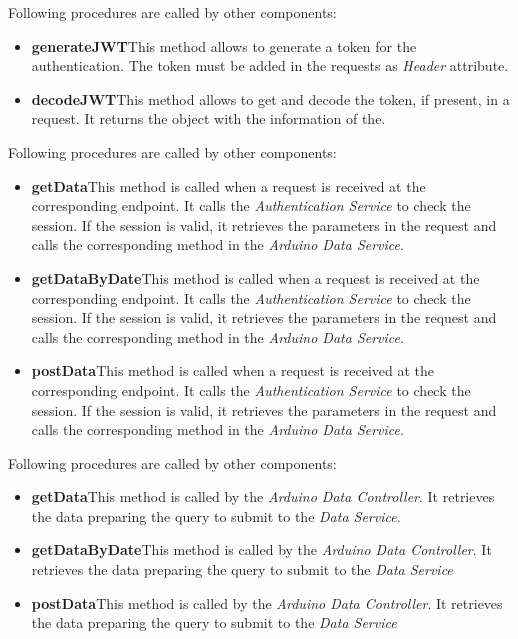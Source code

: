 Following procedures are called by other components:
\begin{itemize}
    \item \textbf{generateJWT}\quad This method allows to generate a token for the authentication. The token must be added in the requests as \textit{Header} attribute.
    \item \textbf{decodeJWT}\quad This method allows to get and decode the token, if present, in a request. It returns the object with the information of the.
\end{itemize}

Following procedures are called by other components:
\begin{itemize}
    \item \textbf{getData}\quad This method is called when a request is received at the corresponding endpoint. It calls the \textit{Authentication Service} to check the session. If the session is valid, it retrieves the parameters in the request and calls the corresponding method in the \textit{Arduino Data Service}.
    \item \textbf{getDataByDate}\quad This method is called when a request is received at the corresponding endpoint. It calls the \textit{Authentication Service} to check the session. If the session is valid, it retrieves the parameters in the request and calls the corresponding method in the \textit{Arduino Data Service}.
    \item \textbf{postData}\quad This method is called when a request is received at the corresponding endpoint. It calls the \textit{Authentication Service} to check the session. If the session is valid, it retrieves the parameters in the request and calls the corresponding method in the \textit{Arduino Data Service}.
\end{itemize}

Following procedures are called by other components:
\begin{itemize}
    \item \textbf{getData}\quad This method is called by the \textit{Arduino Data Controller}. It retrieves the data preparing the query to submit to the \textit{Data Service}.
    \item \textbf{getDataByDate}\quad This method is called by the \textit{Arduino Data Controller}. It retrieves the data preparing the query to submit to the \textit{Data Service}
    \item \textbf{postData}\quad This method is called by the \textit{Arduino Data Controller}. It retrieves the data preparing the query to submit to the \textit{Data Service}
\end{itemize}

